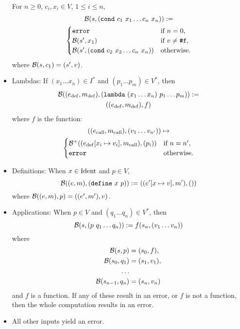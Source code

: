 \begin{itemize}
  For $n \geq 0$, $c_i, x_i \in V$, $1 \leq i \leq n$,
  \begin{multline*}
    \mathcal{B}(s, (\mathtt{cond} \ c_1 \ x_1 \ldots c_n \ x_n)) :=\\
    \begin{cases}
      \mathtt{error} & \text{if $n = 0$,}\\
      \mathcal{B}(s', x_1) & \text{if $v \neq \texttt{\#}\mathtt{f}$,}\\
      \mathcal{B}(s', (\mathtt{cond} \ c_2 \ x_2 \ldots c_n \ x_n)) & \text{otherwise}.
    \end{cases}
  \end{multline*}
  where $\mathcal{B}(s, c_1) = (s', v)$.
\item
  \def\defe{\mathrm{def}}
  \def\calle{\mathrm{call}}
  \def\rete{\mathrm{rete}}
  Lambdas: If $(x_1 \ldots x_n) \in I^*$ and $(p_1 \ldots p_m) \in V^*$, then
  \begin{multline*}
    \B((e_\defe, m_\defe), (\mathtt{lambda} \ (x_1 \ldots x_n) \ p_1 \ldots p_m)) :=\\
    ((e_\defe,m_\defe), f)
  \end{multline*}
  where $f$ is the function:
  \begin{multline*}
    ((e_\calle,m_\calle), (v_1 \ldots v_{n'})) \mapsto\\
    \begin{cases}
      \B^+((e_\defe[x_i \mapsto v_i], m_\calle), (p_i)) & \text{if $n = n'$,}\\
      \mathtt{error} & \text{otherwise.}
    \end{cases}
  \end{multline*}
\item Definitions: When $x \in \mathrm{Ident}$ and $p \in V$,
\[
\mathcal{B}((e,m), (\mathtt{define} \ x \ p)) := ((e'[x \mapsto v], m'), ())
\]
where $\mathcal{B}((e,m), p) = ((e', m'), v)$.
\item Applications: When $p \in V$ and $(q_1 \ldots q_n) \in V^*$, then
\[
\mathcal{B}(s, (p \ q_1 \ldots q_n)) := f(s_n, (v_1 \ldots v_n))
\]
where
\begin{align*}
  \mathcal{B}(s, p) &= (s_0, f),\\
  \mathcal{B}(s_0, q_1) &= (s_1, v_1),\\
  \ldots\\
  \mathcal{B}(s_{n-1}, q_n) &= (s_n, v_n)
\end{align*}
and $f$ is a function. If any of these result in an error, or $f$ is not a
function, then the whole computation results in an error.
\item All other inputs yield an error.
\end{itemize}

